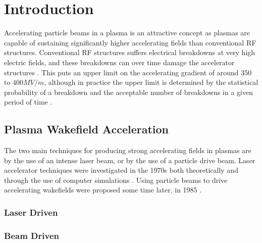 %
%

\chapter{Introduction}
\label{Ch:Intro}

Accelerating particle beams in a plasma is an attractive concept as plasmas are capable of sustaining significantly higher accelerating fields than conventional RF structures. Conventional RF structures suffers electrical breakdowns at very high electric fields, and these breakdowns can over time damage the accelerator structures \cite{braun:2003}. This puts an upper limit on the accelerating gradient of around $350$ to $400\unit{MV/m}$, although in practice the upper limit is determined by the statistical probability of a breakdown and the acceptable number of breakdowns in a given period of time \cite{pritzkau:2002}.

\section{Plasma Wakefield Acceleration}
\label{Int:PWFA}

The two main techniques for producing strong accelerating fields in plasmas are by the use of an intense laser beam, or by the use of a particle drive beam. Laser accelerator techniques were investigated in the 1970s both theoretically \cite{chan:1971,palmer:1972} and through the use of computer simulations \cite{tajima:1979}. Using particle beams to drive accelerating wakefields were proposed some time later, in 1985 \cite{chen:1985}.


\subsection{Laser Driven}
\label{Int:LWFA}

\subsection{Beam Driven}
\label{Int:PDPWFA}

